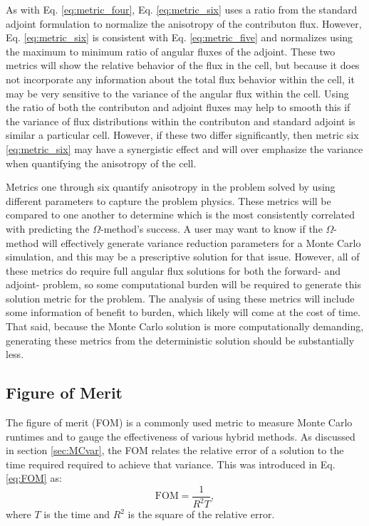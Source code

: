 As with Eq. \ref{eq:metric_four}, Eq. \ref{eq:metric_six} uses a ratio from
the standard adjoint formulation to normalize the anisotropy of the
contributon flux. However, Eq. \ref{eq:metric_six} is consistent with Eq.
\eqref{eq:metric_five} and normalizes using the maximum to minimum
ratio of angular fluxes of the adjoint. These two
metrics will show the relative behavior of the flux in the cell, but because it
does not incorporate any information about the total flux behavior within the
cell, it may be very sensitive to the variance of the angular flux within the
cell. Using the ratio of both the contributon and adjoint fluxes may
help to smooth this if the variance of flux distributions within the contributon
and standard adjoint is similar a particular cell. However, if these two
differ significantly, then metric six \eqref{eq:metric_six} may have a
synergistic effect
and will over emphasize the variance when quantifying the anisotropy of the
cell.

Metrics one through six quantify anisotropy
in the problem solved by using different parameters to capture the problem
physics. These metrics will be compared to one another to determine which is the
most consistently correlated with predicting the $\Omega$-method's success. A
user may want to know if the $\Omega$-method will effectively generate variance
reduction parameters for a Monte Carlo simulation, and this may be a
prescriptive solution for that issue. However, all of these metrics do require
full angular flux solutions for both the forward- and adjoint- problem, so some
computational burden will be required to generate this solution metric for the
problem. The analysis of using these metrics will include some information of
benefit to burden, which likely will come at the cost of time.
That said, because the Monte Carlo solution is more computationally
demanding, generating these metrics from the deterministic solution should be
substantially less.

\subsection{Figure of Merit}

The figure of merit (FOM) is a commonly used metric to measure Monte Carlo
runtimes and to gauge the effectiveness of various hybrid methods. As discussed
in section \ref{sec:MCvar}, the FOM relates the relative error of a solution to the
time required required to achieve that variance. This was introduced in Eq.
\ref{eq:FOM} as:
\begin{equation*}
  \text{FOM} = \frac{1}{R^{2}T} ,
\end{equation*}
where $T$ is the time and $R^{2}$ is the square of the relative error.

